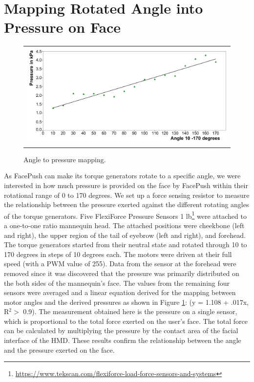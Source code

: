 \section{Mapping Rotated Angle into Pressure on Face}

\begin{figure}[h]
    \begin{center}
        \begin{tabular}{@{\hspace{0.1cm}}c}
            \includegraphics[width=1\linewidth]{figures/a2p}
        \end{tabular}
        \caption{Angle to pressure mapping.}
        \label{fig:angle_to_pressure}
    \end{center}
\end{figure}

As FacePush can make its torque generators rotate to a specific angle, we were interested in how much pressure is provided on the face by FacePush within their rotational range of 0 to 170 degrees. We set up a force sensing resistor to measure the relationship between the pressure exerted against the different rotating angles of the torque generators. Five FlexiForce Pressure Sensors 1 lb\footnote{\url{https://www.tekscan.com/flexiforce-load-force-sensors-and-systems}} were attached to a one-to-one ratio mannequin head. The attached positions were cheekbone (left and right), the upper region of the tail of eyebrow (left and right), and forehead. The torque generators started from their neutral state and rotated through 10 to 170 degrees in steps of 10 degrees each. The motors were driven at their full speed (with a PWM value of 255). Data from the sensor at the forehead were removed since it was discovered that the pressure was primarily distributed on the both sides of the mannequin's face. The values from the remaining four sensors were averaged and a linear equation derived for the mapping between motor angles and the derived pressures as shown in Figure \ref{fig:angle_to_pressure}: (y = 1.108 + .017x, R$^2 >$ 0.9). The measurement obtained here is the pressure on a single sensor, which is proportional to the total force exerted on the user's face. The total force can be calculated by multiplying the pressure by the contact area of the facial interface of the HMD. These results confirm the relationship between the angle and the pressure exerted on the face.